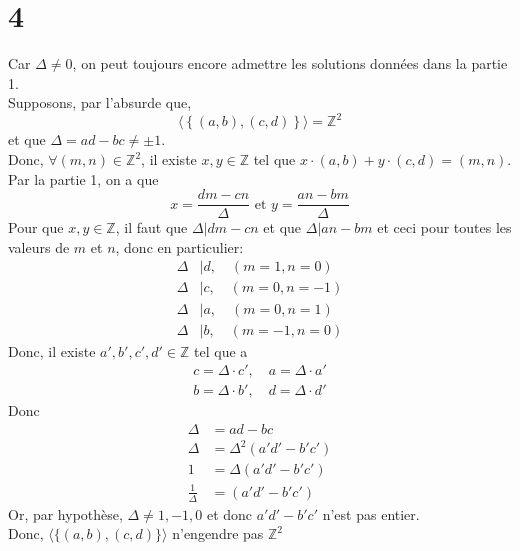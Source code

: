 \documentclass[11pt, a4paper, twoside]{article}
\begin{document}
\section*{4}
Car $\Delta \neq 0$, on peut toujours encore admettre les solutions données dans la partie 1.\\
Supposons, par l'absurde que, 
\[ 
\langle \left\{ ( a,b), ( c,d) \right\} \rangle = \mathbb{Z}^{2} 
\]
et que $\Delta =ad - bc \neq \pm 1$.\\
Donc, $\forall (m,n) \in \mathbb{Z}^{2}$, il existe $x,y \in \mathbb{Z}$ tel que
$x\cdot ( a,b) + y \cdot ( c,d)= (m,n)$.\\
Par la partie 1, on a que 
\[ 
x = \frac{dm-cn}{\Delta} \text{ et }  y = \frac{an-bm}{\Delta}
\]
Pour que $x, y \in \mathbb{Z}$, il faut que $\Delta | dm -cn$ et que $\Delta | an-bm$ et ceci pour toutes les valeurs de $m$ et $n$, donc en particulier:
\begin{align*}
	\Delta &| d, \quad ( m=1, n=0)\\
	\Delta &| c, \quad ( m=0, n=-1)\\
	\Delta &| a, \quad ( m=0,n=1)\\
	\Delta &| b, \quad ( m=-1,n=0)
\end{align*}
Donc, il existe $a', b', c', d' \in \mathbb{Z}$ tel que
a
\begin{align*}
	c = \Delta \cdot c', \quad a = \Delta \cdot a'\\
	b = \Delta \cdot b', \quad d = \Delta \cdot d'
\end{align*}
Donc 
\begin{align*}
	\Delta &= ad -bc\\
	\Delta &= \Delta^{2}(a'd' - b'c')\\
	1 &= \Delta(a'd' - b'c')\\
	\frac{1}{\Delta} &= (a'd' - b'c')
\end{align*}
Or, par hypothèse, $\Delta \neq 1,-1,0$ et donc $a'd' - b'c'$ n'est pas entier.\\
Donc, $\langle\{(a,b),(c,d) \}\rangle$ n'engendre pas $\mathbb{Z}^{2}$






	
\end{document}
